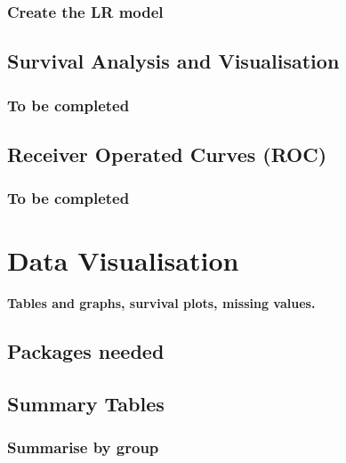 \documentclass[
]{article}
\begin{document}
\hypertarget{create-the-lr-model}{%
\subsubsection{Create the LR model}\label{create-the-lr-model}}

\hypertarget{survival-analysis-and-visualisation}{%
\subsection{Survival Analysis and Visualisation}\label{survival-analysis-and-visualisation}}

\hypertarget{to-be-completed-1}{%
\subsubsection{To be completed}\label{to-be-completed-1}}

\hypertarget{receiver-operated-curves-roc}{%
\subsection{Receiver Operated Curves (ROC)}\label{receiver-operated-curves-roc}}

\hypertarget{to-be-completed-2}{%
\subsubsection{To be completed}\label{to-be-completed-2}}

\hypertarget{data-visualisation}{%
\section{Data Visualisation}\label{data-visualisation}}

\textbf{Tables and graphs, survival plots, missing values.}

\hypertarget{packages-needed}{%
\subsection{Packages needed}\label{packages-needed}}

\hypertarget{summary-tables}{%
\subsection{Summary Tables}\label{summary-tables}}

\hypertarget{summarise-by-group}{%
\subsubsection{Summarise by group}\label{summarise-by-group}}
\end{document}
